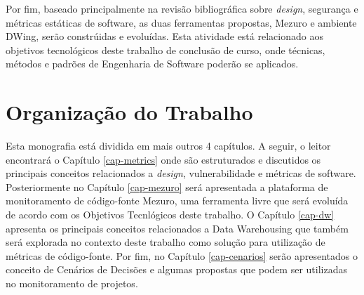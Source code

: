 %

Por fim, baseado principalmente na revisão bibliográfica sobre \emph{design}, segurança e métricas estáticas de software, as duas ferramentas propostas, Mezuro e ambiente DWing, serão constrúidas e evoluídas. Esta atividade está relacionado aos objetivos tecnológicos deste trabalho de conclusão de curso, onde técnicas, métodos e padrões de Engenharia de Software poderão se aplicados.


\section{Organização do Trabalho}

Esta monografia está dividida em mais outros 4 capítulos. A seguir, o leitor encontrará o Capítulo \ref{cap-metrics} onde são estruturados e discutidos os principais conceitos relacionados a \emph{design}, vulnerabilidade e métricas de software. Posteriormente no Capítulo \ref{cap-mezuro} será apresentada a plataforma de monitoramento de código-fonte Mezuro, uma ferramenta livre que será evoluída de acordo com os Objetivos Tecnlógicos deste trabalho. O Capítulo \ref{cap-dw} apresenta os principais conceitos relacionados a Data Warehousing que também será explorada no contexto deste trabalho como solução para utilização de métricas de código-fonte. Por fim, no Capítulo \ref{cap-cenarios} serão apresentados o conceito de Cenários de Decisões e algumas propostas que podem ser utilizadas no monitoramento de projetos.
